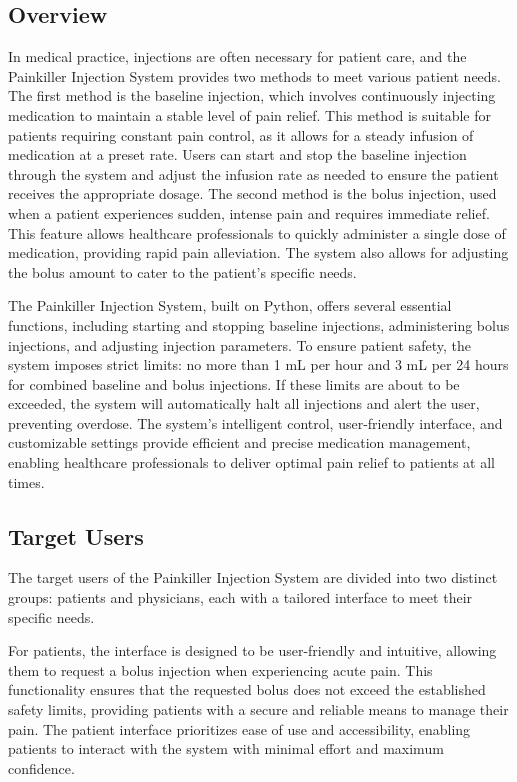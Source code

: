 \documentclass{article}
\begin{document}
\subsection{Overview}
In medical practice, injections are often necessary for patient care, and the Painkiller Injection System provides two methods to meet various patient needs.
The first method is the baseline injection, which involves continuously injecting medication to maintain a stable level of pain relief. This method is suitable for patients requiring constant pain control, as it allows for a steady infusion of medication at a preset rate. Users can start and stop the baseline injection through the system and adjust the infusion rate as needed to ensure the patient receives the appropriate dosage.
The second method is the bolus injection, used when a patient experiences sudden, intense pain and requires immediate relief. This feature allows healthcare professionals to quickly administer a single dose of medication, providing rapid pain alleviation.
The system also allows for adjusting the bolus amount to cater to the patient's specific needs.

The Painkiller Injection System, built on Python, offers several essential functions, including starting and stopping baseline injections, administering bolus injections, and adjusting injection parameters. To ensure patient safety, the system imposes strict limits: no more than 1 mL per hour and 3 mL per 24 hours for combined baseline and bolus injections.
If these limits are about to be exceeded, the system will automatically halt all injections and alert the user, preventing overdose. The system's intelligent control, user-friendly interface, and customizable settings provide efficient and precise medication management, enabling healthcare professionals to deliver optimal pain relief to patients at all times.
\subsection{Target Users}
The target users of the Painkiller Injection System are divided into two distinct groups: patients and physicians, each with a tailored interface to meet their specific needs.

For patients, the interface is designed to be user-friendly and intuitive, allowing them to request a bolus injection when experiencing acute pain. This functionality ensures that the requested bolus does not exceed the established safety limits, providing patients with a secure and reliable means to manage their pain. The patient interface prioritizes ease of use and accessibility, enabling patients to interact with the system with minimal effort and maximum confidence.
\end{document}
